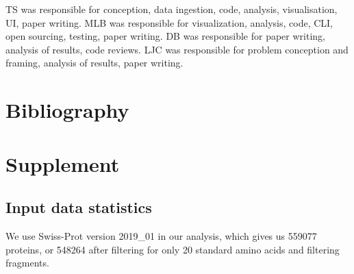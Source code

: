 \begin{contributions}
  TS was responsible for conception, data ingestion, code, analysis, visualisation, UI, paper writing. MLB was
  responsible for visualization, analysis, code, CLI, open sourcing, testing, paper writing. DB was responsible for
  paper writing, analysis of results, code reviews. LJC was responsible for problem conception and framing, analysis of results, paper writing.
\end{contributions}

  
  \section*{Bibliography}
\DIFdelbegin %
\DIFdelend \DIFaddbegin 
\DIFaddend 

\onecolumn
\newpage

\section*{Supplement}
\beginsupplement


\subsection{Input data statistics}

We use Swiss-Prot version 2019\_01 in our analysis, which gives us 559077 proteins, or 548264 after filtering for only 20 standard amino acids and filtering fragments.
\DIFaddbegin 


